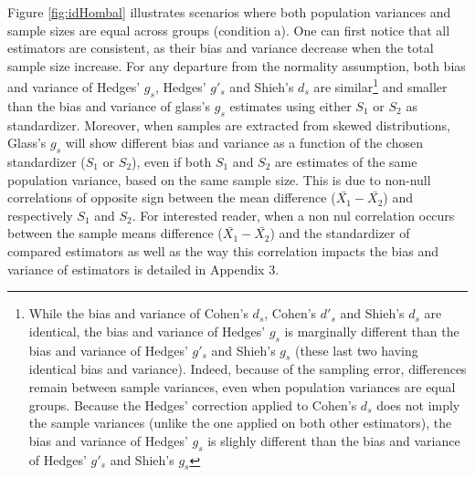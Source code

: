 \documentclass[
  man,floatsintext]{apa6}
\begin{document}
Figure \ref{fig:idHombal} illustrates scenarios where both population variances and sample sizes are equal across groups (condition a). One can first notice that all estimators are consistent, as their bias and variance decrease when the total sample size increase. For any departure from the normality assumption, both bias and variance of Hedges' \(g_s\), Hedges' \(g'_s\) and Shieh's \(d_s\) are similar\footnote{While the bias and variance of Cohen's $d_s$, Cohen's $d'_s$ and Shieh's $d_s$ are identical, the bias and variance of Hedges' $g_s$ is marginally different than the bias and variance of Hedges' $g'_s$ and Shieh's $g_s$ (these last two having identical bias and variance). Indeed, because of the sampling error, differences remain between sample variances, even when population variances are equal groups. Because the Hedges' correction applied to Cohen's $d_s$ does not imply the sample variances (unlike the one applied on both other estimators), the bias and variance of Hedges' $g_s$ is slighly different than the bias and variance of Hedges' $g'_s$ and Shieh's $g_s$} and smaller than the bias and variance of glass's \(g_s\) estimates using either \(S_1\) or \(S_2\) as standardizer. Moreover, when samples are extracted from skewed distributions, Glass's \(g_s\) will show different bias and variance as a function of the chosen standardizer (\(S_1\) or \(S_2\)), even if both \(S_1\) and \(S_2\) are estimates of the same population variance, based on the same sample size. This is due to non-null correlations of opposite sign between the mean difference (\(\bar{X_1}-\bar{X_2}\)) and respectively \(S_1\) and \(S_2\). For interested reader, when a non nul correlation occurs between the sample means difference (\(\bar{X_1}-\bar{X_2}\)) and the standardizer of compared estimators as well as the way this correlation impacts the bias and variance of estimators is detailed in Appendix 3.
\end{document}
